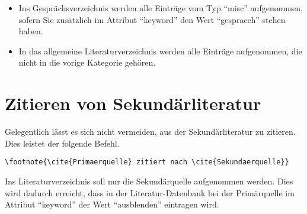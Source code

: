 \begin{itemize}
\item Ins Gesprächsverzeichnis werden alle Einträge vom Typ \enquote{misc} aufgenommen, sofern Sie zusätzlich im Attribut \enquote{keyword} den Wert \enquote{gespraech} stehen haben. 

\item In das allgemeine Literaturverzeichnis werden alle Einträge aufgenommen, die nicht in die vorige Kategorie gehören.
\end{itemize} 

\section{Zitieren von Sekundärliteratur}
Gelegentlich lässt es sich nicht vermeiden, aus der Sekundärliteratur zu zitieren. Dies leistet der folgende Befehl.
\begin{verbatim}
\footnote{\cite{Primaerquelle} zitiert nach \cite{Sekundaerquelle}}
\end{verbatim}
Ins Literaturverzeichnis soll nur die Sekundärquelle aufgenommen werden. Dies wird dadurch erreicht, dass in der Literatur-Datenbank bei der Primärquelle im Attribut \enquote{keyword} der Wert \enquote{ausblenden} eintragen wird.
